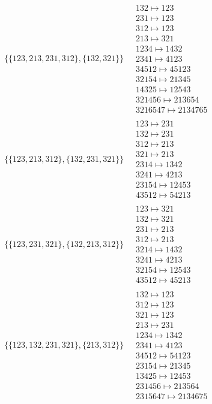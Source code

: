 \begin{scriptsize}
\begin{align}
\begin{matrix}
\end{matrix}
\\
\{\{123, 213, 231, 312\}, \{132, 321\}\}
\ 
&
\begin{matrix}
132 \mapsto 123\\231 \mapsto 123\\312 \mapsto 123\\213 \mapsto 321\\1234 \mapsto 1432\\2341 \mapsto 4123\\34512 \mapsto 45123\\32154 \mapsto 21345\\14325 \mapsto 12543\\321456 \mapsto 213654\\3216547 \mapsto 2134765
\end{matrix}
\\
\{\{123, 213, 312\}, \{132, 231, 321\}\}
\ 
&
\begin{matrix}
123 \mapsto 231\\132 \mapsto 231\\312 \mapsto 213\\321 \mapsto 213\\2314 \mapsto 1342\\3241 \mapsto 4213\\23154 \mapsto 12453\\43512 \mapsto 54213
\end{matrix}
\\
\{\{123, 231, 321\}, \{132, 213, 312\}\}
\ 
&
\begin{matrix}
123 \mapsto 321\\132 \mapsto 321\\231 \mapsto 213\\312 \mapsto 213\\3214 \mapsto 1432\\3241 \mapsto 4213\\32154 \mapsto 12543\\43512 \mapsto 45213
\end{matrix}
\\
\{\{123, 132, 231, 321\}, \{213, 312\}\}
\ 
&
\begin{matrix}
132 \mapsto 123\\312 \mapsto 123\\321 \mapsto 123\\213 \mapsto 231\\1234 \mapsto 1342\\2341 \mapsto 4123\\34512 \mapsto 54123\\23154 \mapsto 21345\\13425 \mapsto 12453\\231456 \mapsto 213564\\2315647 \mapsto 2134675

\end{matrix}
\end{align}
\end{scriptsize}
